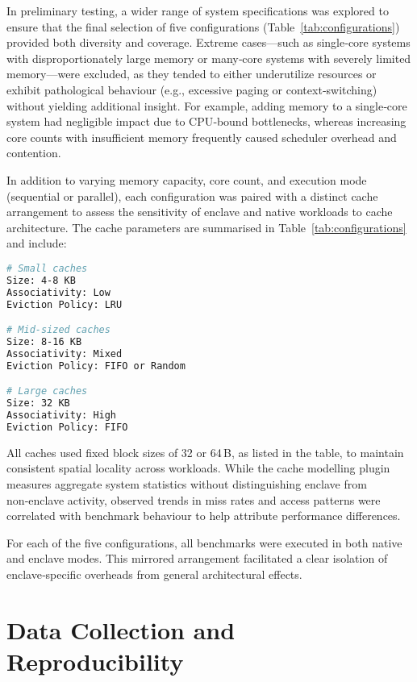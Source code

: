 In preliminary testing, a wider range of system specifications was explored to ensure that the final selection of five configurations (Table~\ref{tab:configurations}) provided both diversity and coverage. Extreme cases—such as single‑core systems with disproportionately large memory or many‑core systems with severely limited memory—were excluded, as they tended to either underutilize resources or exhibit pathological behaviour (e.g., excessive paging or context‑switching) without yielding additional insight. For example, adding memory to a single‑core system had negligible impact due to CPU‑bound bottlenecks, whereas increasing core counts with insufficient memory frequently caused scheduler overhead and contention.

In addition to varying memory capacity, core count, and execution mode (sequential or parallel), each configuration was paired with a distinct cache arrangement to assess the sensitivity of enclave and native workloads to cache architecture. The cache parameters are summarised in Table~\ref{tab:configurations} and include:

\begin{lstlisting}[language=bash,caption={Cache configuration profiles},label={lst:cache_profiles}]
# Small caches
Size: 4-8 KB
Associativity: Low
Eviction Policy: LRU

# Mid-sized caches
Size: 8-16 KB
Associativity: Mixed
Eviction Policy: FIFO or Random

# Large caches
Size: 32 KB
Associativity: High
Eviction Policy: FIFO
\end{lstlisting}


All caches used fixed block sizes of 32 or 64\,B, as listed in the table, to maintain consistent spatial locality across workloads. While the cache modelling plugin measures aggregate system statistics without distinguishing enclave from non‑enclave activity, observed trends in miss rates and access patterns were correlated with benchmark behaviour to help attribute performance differences.

For each of the five configurations, all benchmarks were executed in both native and enclave modes. This mirrored arrangement facilitated a clear isolation of enclave‑specific overheads from general architectural effects.

\section{Data Collection and Reproducibility}
\label{sec:data-collection}

